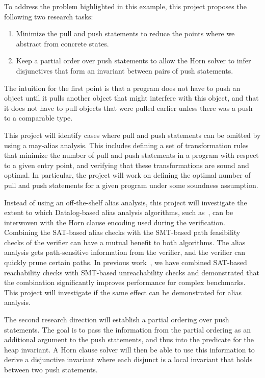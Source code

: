To address the problem highlighted in this example, this project proposes the following two research tasks:
\begin{enumerate}
\item Minimize the pull and push statements to reduce the points where we abstract from concrete states.
\item Keep a partial order over push statements to allow the Horn solver to infer disjunctives that form an invariant between pairs of push statements. 
\end{enumerate}
The intuition for the first point is that a program does not have to push an 
object until it pulls another object that might interfere with this object, and 
that it does not have to pull  objects that were pulled earlier unless 
there was a push to a comparable type. 

This project will identify cases where pull and push statements can be omitted by using a 
may-alias analysis. This includes defining a set of transformation rules that 
minimize the number of pull and push statements in a program with respect to 
a given entry point, and verifying that these transformations are sound and 
optimal. In particular, the project will work on defining the optimal
number of pull and push statements for a given program under some soundness
assumption.


Instead of using an off-the-shelf alias analysis, this project will investigate
the extent to which Datalog-based alias analysis algorithms, such 
as~\cite{DBLP:conf/aaai/MangalZKNN16,Zhang:2016:QMS:2837614.2837658}, can be
interwoven with the Horn clause encoding used during the verification. Combining
the SAT-based alias checks with the SMT-based path feasibility checks of the
verifier can have a mutual benefit to both algorithms. The alias analysis
gets path-sensitive information from the verifier, and the verifier can quickly
prune certain paths. In previous work~\cite{DBLP:conf/nfm/Schwartz-Narbonne15}, 
we have combined SAT-based reachability checks with SMT-based unreachability 
checks and demonstrated that the combination significantly improves 
performance for complex benchmarks. This project will investigate
if the same effect can be demonstrated for alias analysis.


The second research direction will establish a partial ordering over push 
statements. The goal is to pass the information from the partial ordering
as an additional argument to the push statements, and thus into the predicate
for the heap invariant. A Horn clause solver will then be able to use
this information to derive a disjunctive invariant where each disjunct is
a local invariant that holds between two push statements.



